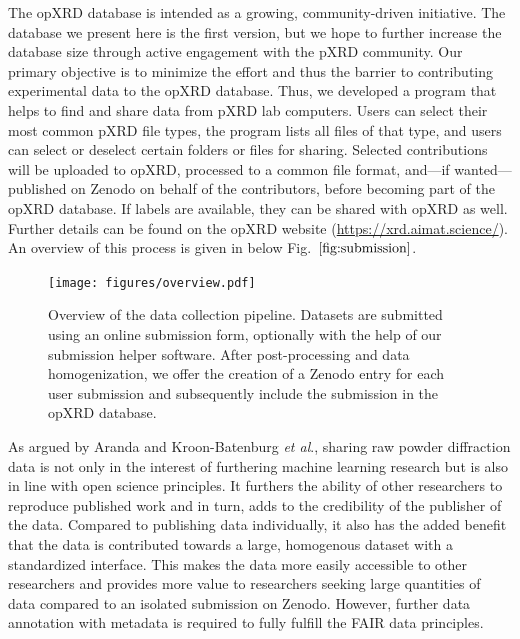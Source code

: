 The opXRD database is intended as a growing, community-driven initiative. The database we present here is the first version, but we hope to further increase the database size through active engagement with the pXRD community. Our primary objective is to minimize the effort and thus the barrier to contributing experimental data to the opXRD database. Thus, we developed a program that helps to find and share data from pXRD lab computers. Users can select their most common pXRD file types, the program lists all files of that type, and users can select or deselect certain folders or files for sharing. Selected contributions will be uploaded to opXRD, processed to a common file format, and---if wanted---published on Zenodo on behalf of the contributors, before becoming part of the opXRD database. If labels are available, they can be shared with opXRD as well. Further details can be found on the opXRD website (\url{https://xrd.aimat.science/}). An overview of this process is given in below Fig.~$\eqref{fig:submission}$.  \\

\begin{figure}[!htb]
    \centering
    \texttt{[image: figures/overview.pdf]}
    \caption{Overview of the data collection pipeline. Datasets are submitted using an online submission form, optionally with the help of our submission helper software. After post-processing and data homogenization, we offer the creation of a Zenodo entry for each user submission and subsequently include the submission in the opXRD database.}
    \label{fig:submission}
\end{figure}

As argued by Aranda and Kroon-Batenburg \textit{et al}.\cite{Aranda2018, Kroon-Batenburg2024}, sharing raw powder diffraction data is not only in the interest of furthering machine learning research but is also in line with open science principles. It furthers the ability of other researchers to reproduce published work and in turn, adds to the credibility of the publisher of the data. Compared to publishing data individually, it also has the added benefit that the data is contributed towards a large, homogenous dataset with a standardized interface. This makes the data more easily accessible to other researchers and provides more value to researchers seeking large quantities of data compared to an isolated submission on Zenodo. However, further data annotation with metadata is required to fully fulfill the FAIR data principles.\\

